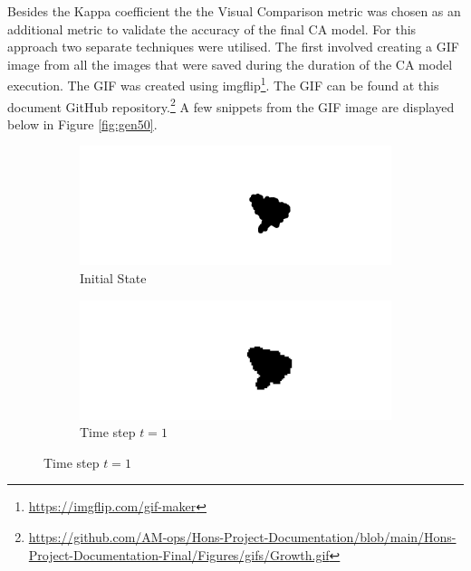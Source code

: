 Besides the Kappa coefficient the the Visual Comparison metric was chosen as an additional metric to validate the accuracy of the final CA model. For this approach two separate techniques were utilised. The first involved creating a GIF image from all the images that were saved during the duration of the CA model execution. The GIF was created using imgflip\footnote{\url{https://imgflip.com/gif-maker}}. The GIF can be found at this document GitHub repository.\footnote{\url{https://github.com/AM-ops/Hons-Project-Documentation/blob/main/Hons-Project-Documentation-Final/Figures/gifs/Growth.gif}} A few snippets from the GIF image are displayed below in Figure \ref{fig:gen50}.
\begin{figure}[H]
\begin{subfigure}{.5\textwidth}
  \centering
  \includegraphics[width=1\linewidth]{Figures/Chapter4/generation-0-melusi}
  \caption*{Initial State}
\end{subfigure}
\begin{subfigure}{.5\textwidth}
  \centering
  \includegraphics[width=1\linewidth]{Figures/Chapter4/generation-1-melusi}
  \caption*{Time step $t = 1$}
\end{subfigure}
\end{figure}


